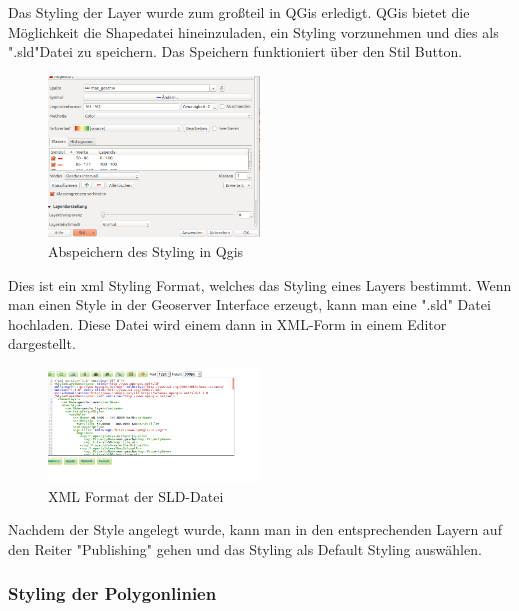 Das Styling der Layer wurde zum großteil in QGis erledigt. QGis bietet die Möglichkeit die Shapedatei hineinzuladen, ein Styling vorzunehmen und dies als ".sld"Datei zu speichern. Das Speichern funktioniert über den Stil Button.
\begin{figure}[h]
\centering
	\includegraphics[width=0.5\textwidth]{images/save_styling.png}
	\caption{Abspeichern des Styling in Qgis}
\end{figure}
Dies ist ein xml Styling Format, welches das Styling eines  Layers bestimmt.
Wenn man einen Style in der Geoserver Interface erzeugt, kann man eine ".sld" Datei hochladen. Diese Datei wird einem dann in XML-Form in einem Editor dargestellt.
\begin{figure}[h]
\centering
	\includegraphics[width=0.5\textwidth]{images/StyleXML.png}
	\caption{XML Format der SLD-Datei}
\end{figure}
Nachdem der Style angelegt wurde, kann man in den entsprechenden Layern auf den Reiter "Publishing" gehen und das Styling als Default Styling auswählen.
\pagebreak
\subsubsection{Styling der Polygonlinien}


